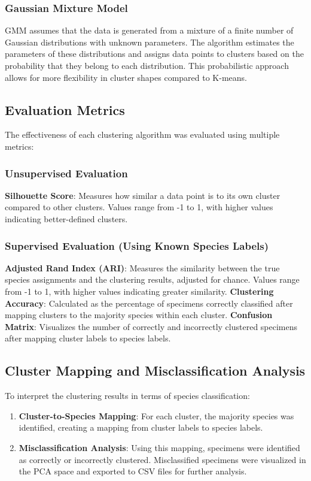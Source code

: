 \documentclass[a4paper,12pt]{report}
\begin{document}
\subsubsection{Gaussian Mixture Model}

GMM assumes that the data is generated from a mixture of a finite number of Gaussian distributions with unknown parameters. The algorithm estimates the parameters of these distributions and assigns data points to clusters based on the probability that they belong to each distribution. This probabilistic approach allows for more flexibility in cluster shapes compared to K-means.

\subsection{Evaluation Metrics}
The effectiveness of each clustering algorithm was evaluated using multiple metrics:

\subsubsection{Unsupervised Evaluation}
\textbf{Silhouette Score}: Measures how similar a data point is to its own cluster compared to other clusters. Values range from -1 to 1, with higher values indicating better-defined clusters.

\subsubsection{Supervised Evaluation (Using Known Species Labels)}
\textbf{Adjusted Rand Index (ARI)}: Measures the similarity between the true species assignments and the clustering results, adjusted for chance. Values range from -1 to 1, with higher values indicating greater similarity.
\textbf{Clustering Accuracy}: Calculated as the percentage of specimens correctly classified after mapping clusters to the majority species within each cluster.
\textbf{Confusion Matrix}: Visualizes the number of correctly and incorrectly clustered specimens after mapping cluster labels to species labels.

\subsection{Cluster Mapping and Misclassification Analysis}
To interpret the clustering results in terms of species classification:
\begin{enumerate}
    \item \textbf{Cluster-to-Species Mapping}: For each cluster, the majority species was identified, creating a mapping from cluster labels to species labels.
    \item \textbf{Misclassification Analysis}: Using this mapping, specimens were identified as correctly or incorrectly clustered. Misclassified specimens were visualized in the PCA space and exported to CSV files for further analysis.
\end{enumerate}
\end{document}
